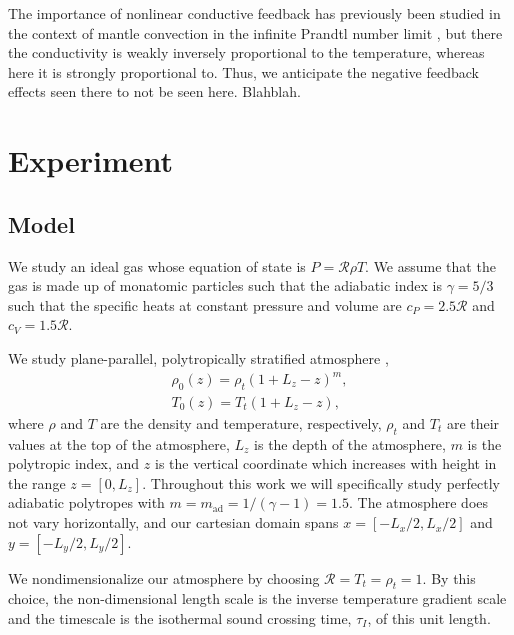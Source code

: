 \documentclass[twocolumn, amsmath, amsfonts, amssymb]{aastex62}
\begin{document}
The importance of nonlinear conductive feedback has previously been studied in
the context of mantle convection in the infinite Prandtl number limit
\citep{dubuffet&all2000}, but there the conductivity is weakly inversely proportional
to the temperature, whereas here it is strongly proportional to. Thus, we anticipate
the negative feedback effects seen there to not be seen here. Blahblah.





\section{Experiment} \label{sec:experiment}
\subsection{Model}
\label{sec:model}
We study an ideal gas whose equation of state is
$P = \mathcal{R}\rho T$. We assume that the gas is made up of monatomic
particles such that the adiabatic index is $\gamma = 5/3$ such that the specific
heats at constant pressure and volume are $c_P = 2.5\mathcal{R}$ and $c_V = 1.5\mathcal{R}$.

We study plane-parallel, polytropically
stratified atmosphere \citep{anders&brown2017},
\begin{gather}
\rho_0(z) = \rho_{t}(1 + L_z - z)^m, \\
T_0(z)    = T_{t}(1 + L_z - z),
\end{gather}
where $\rho$ and $T$ are the density and temperature, respectively,
$\rho_{t}$ and $T_{t}$ are their values at the top of the atmosphere,
$L_z$ is the depth of the atmosphere, $m$ is the polytropic index,
and $z$ is the vertical coordinate which increases with height in the
range $z=[0,L_z]$.
Throughout this work we will specifically study perfectly adiabatic
polytropes with $m = m_{\text{ad}} = 1/(\gamma - 1) = 1.5$.
The atmosphere does not vary horizontally, and our cartesian domain
spans $x = [-L_x/2, L_x/2]$ and $y = [-L_y/2, L_y/2]$.

We nondimensionalize our atmosphere by choosing
$\mathcal{R} = T_t = \rho_t = 1$.
By this choice, the non-dimensional
length scale is the inverse temperature gradient scale and the 
timescale is the isothermal sound crossing time, 
$\tau_I$, of this unit length.
\end{document}

